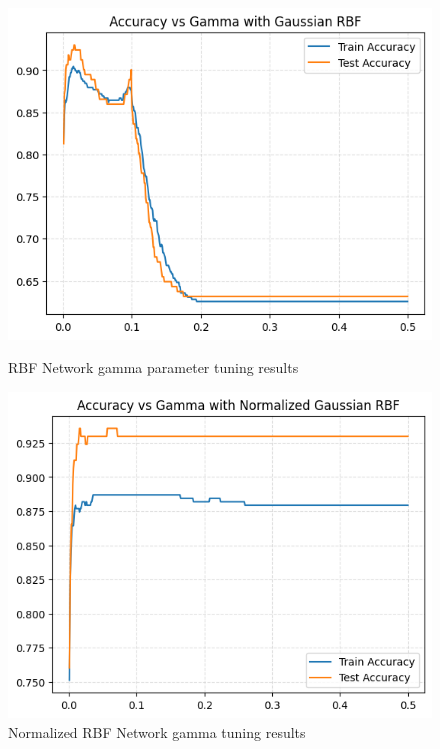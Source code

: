 \documentclass[11pt]{article}
\begin{document}
\begin{figure}[H]
  \centering
  \begin{minipage}{0.48\textwidth}
    \includegraphics[width=\linewidth]{img/GammaHyperparameterTuning.png}
    \caption{RBF Network gamma parameter tuning results}
    \label{fig:rbf-gamma-gaus}
  \end{minipage}
  \hfill
  \begin{minipage}{0.48\textwidth}
    \includegraphics[width=\linewidth]{img/NormGammaHyperparameterTuning.png}
    \caption{Normalized RBF Network gamma tuning results}
  \end{minipage}
\end{figure}
\end{document}
